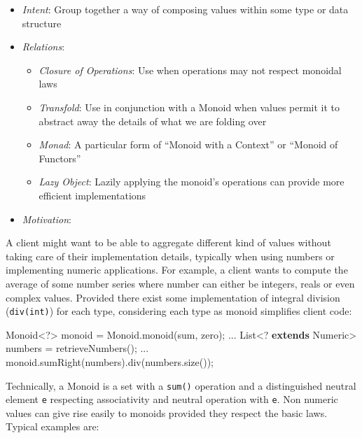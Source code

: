 \documentclass[11pt,]{article}
\newenvironment{Shaded}{}{}
\newcommand{\KeywordTok}[1]{\textcolor[rgb]{0.00,0.44,0.13}{\textbf{{#1}}}}
\newcommand{\FunctionTok}[1]{\textcolor[rgb]{0.02,0.16,0.49}{{#1}}}
\newcommand{\NormalTok}[1]{{#1}}
\begin{document}
\begin{itemize}
\item
  \emph{Intent}: Group together a way of composing values within some
  type or data structure
\item
  \emph{Relations}:

  \begin{itemize}
  \item
    \emph{Closure of Operations}: Use when operations may not respect
    monoidal laws
  \item
    \emph{Transfold}: Use in conjunction with a Monoid when values
    permit it to abstract away the details of what we are folding over
  \item
    \emph{Monad}: A particular form of ``Monoid with a Context'' or
    ``Monoid of Functors''
  \item
    \emph{Lazy Object}: Lazily applying the monoid's operations can
    provide more efficient implementations
  \end{itemize}
\item
  \emph{Motivation}:
\end{itemize}

A client might want to be able to aggregate different kind of values
without taking care of their implementation details, typically when
using numbers or implementing numeric applications. For example, a
client wants to compute the average of some number series where number
can either be integers, reals or even complex values. Provided there
exist some implementation of integral division (\texttt{div(int)}) for
each type, considering each type as monoid simplifies client code:

\begin{Shaded}
\begin{Highlighting}[]
\NormalTok{Monoid<?> monoid = Monoid.}\FunctionTok{monoid}\NormalTok{(sum, zero);}
\NormalTok{...}
\NormalTok{List<? }\KeywordTok{extends} \NormalTok{Numeric> numbers = }\FunctionTok{retrieveNumbers}\NormalTok{();}
\NormalTok{...}
\NormalTok{monoid.}\FunctionTok{sumRight}\NormalTok{(numbers).}\FunctionTok{div}\NormalTok{(numbers.}\FunctionTok{size}\NormalTok{());}
\end{Highlighting}
\end{Shaded}

Technically, a Monoid is a set with a \texttt{sum()} operation and a
distinguished neutral element \texttt{e} respecting associativity and
neutral operation with \texttt{e}. Non numeric values can give rise
easily to monoids provided they respect the basic laws. Typical examples
are:
\end{document}
